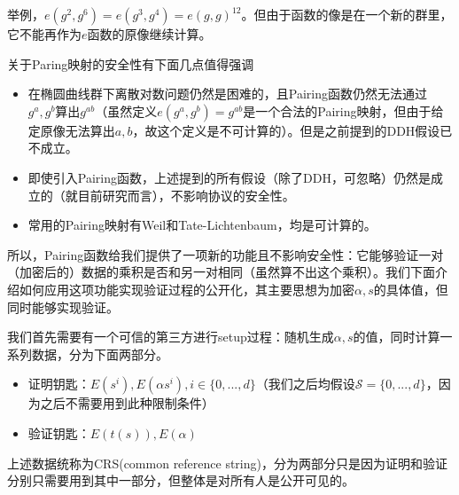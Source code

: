\documentclass[12pt]{article}
\newcommand{\ds}{\{0,...,d\}}
\begin{document}
举例，$e(g^2,g^6)=e(g^3,g^4)=e(g,g)^{12}$。但由于函数的像是在一个新的群里，它不能再作为$e$函数的原像继续计算。

关于Paring映射的安全性有下面几点值得强调
\begin{itemize}
	\item 在椭圆曲线群下离散对数问题仍然是困难的，且Pairing函数仍然无法通过$g^{a},g^b$算出$g^{ab}$（虽然定义$e(g^a,g^b)=g^{ab}$是一个合法的Pairing映射，但由于给定原像无法算出$a,b$，故这个定义是不可计算的）。但是之前提到的DDH假设已不成立。
	\item 即使引入Pairing函数，上述提到的所有假设（除了DDH，可忽略）仍然是成立的（就目前研究而言），不影响协议的安全性。
	\item 常用的Pairing映射有Weil和Tate-Lichtenbaum，均是可计算的。
\end{itemize}
所以，Pairing函数给我们提供了一项新的功能且不影响安全性：它能够验证一对（加密后的）数据的乘积是否和另一对相同（虽然算不出这个乘积）。我们下面介绍如何应用这项功能实现验证过程的公开化，其主要思想为加密$\alpha,s$的具体值，但同时能够实现验证。

我们首先需要有一个可信的第三方进行setup过程：随机生成$\alpha,s$的值，同时计算一系列数据，分为下面两部分。
\begin{itemize}
	\item 证明钥匙：$E(s^i), E(\alpha s^i), i \in \ds $（我们之后均假设$\mathcal{S}=\ds$，因为之后不需要用到此种限制条件）
	\item 验证钥匙：$E(t(s)),E(\alpha)$
\end{itemize}
上述数据统称为CRS(common reference string)，分为两部分只是因为证明和验证分别只需要用到其中一部分，但整体是对所有人是公开可见的。
\end{document}
